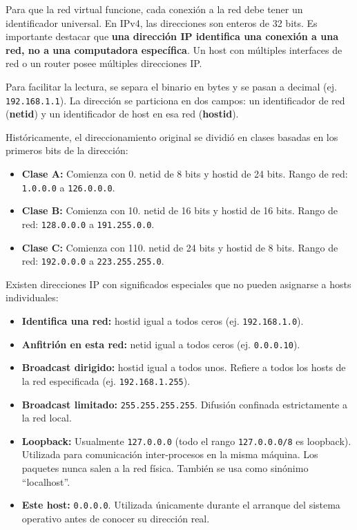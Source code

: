 Para que la red virtual funcione, cada conexión a la red debe tener un identificador universal. En IPv4, las direcciones son enteros de 32 bits. Es importante destacar que \textbf{una dirección IP identifica una conexión a una red, no a una computadora específica}. Un host con múltiples interfaces de red o un router posee múltiples direcciones IP.

Para facilitar la lectura, se separa el binario en bytes y se pasan a decimal (ej. \texttt{192.168.1.1}). La dirección se particiona en dos campos: un identificador de red (\textbf{netid}) y un identificador de host en esa red (\textbf{hostid}). 

Históricamente, el direccionamiento original se dividió en clases basadas en los primeros bits de la dirección:
\begin{itemize}
    \item \textbf{Clase A:} Comienza con 0. netid de 8 bits y hostid de 24 bits. Rango de red: \texttt{1.0.0.0} a \texttt{126.0.0.0}.
    \item \textbf{Clase B:} Comienza con 10. netid de 16 bits y hostid de 16 bits. Rango de red: \texttt{128.0.0.0} a \texttt{191.255.0.0}.
    \item \textbf{Clase C:} Comienza con 110. netid de 24 bits y hostid de 8 bits. Rango de red: \texttt{192.0.0.0} a \texttt{223.255.255.0}.
\end{itemize}

Existen direcciones IP con significados especiales que no pueden asignarse a hosts individuales:
\begin{itemize}
    \item \textbf{Identifica una red:} hostid igual a todos ceros (ej. \texttt{192.168.1.0}).
    \item \textbf{Anfitrión en esta red:} netid igual a todos ceros (ej. \texttt{0.0.0.10}).
    \item \textbf{Broadcast dirigido:} hostid igual a todos unos. Refiere a todos los hosts de la red especificada (ej. \texttt{192.168.1.255}).
    \item \textbf{Broadcast limitado:} \texttt{255.255.255.255}. Difusión confinada estrictamente a la red local.
    \item \textbf{Loopback:} Usualmente \texttt{127.0.0.0} (todo el rango \texttt{127.0.0.0/8} es loopback). Utilizada para comunicación inter-procesos en la misma máquina. Los paquetes nunca salen a la red física. También se usa como sinónimo ``localhost''.
    \item \textbf{Este host:} \texttt{0.0.0.0}. Utilizada únicamente durante el arranque del sistema operativo antes de conocer su dirección real.
\end{itemize}

